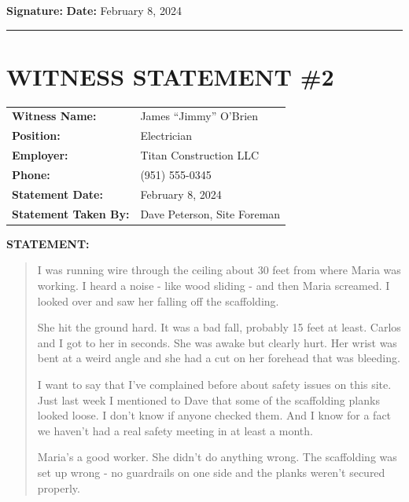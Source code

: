 \documentclass[11pt]{article}
\begin{document}
\vspace{1em}

\noindent\textbf{Signature:} \underline{\hspace{5cm}} \hfill \textbf{Date:} February 8, 2024

\vspace{3em}
\hrule
\vspace{2em}

\section*{WITNESS STATEMENT \#2}

\begin{tabular}{@{}p{4cm}p{10cm}@{}}
\textbf{Witness Name:} & James ``Jimmy'' O'Brien \\
\textbf{Position:} & Electrician \\
\textbf{Employer:} & Titan Construction LLC \\
\textbf{Phone:} & (951) 555-0345 \\
\textbf{Statement Date:} & February 8, 2024 \\
\textbf{Statement Taken By:} & Dave Peterson, Site Foreman \\
\end{tabular}

\vspace{1em}

\noindent\textbf{STATEMENT:}

\begin{quote}
I was running wire through the ceiling about 30 feet from where Maria was working. I heard a noise - like wood sliding - and then Maria screamed. I looked over and saw her falling off the scaffolding.

She hit the ground hard. It was a bad fall, probably 15 feet at least. Carlos and I got to her in seconds. She was awake but clearly hurt. Her wrist was bent at a weird angle and she had a cut on her forehead that was bleeding.

I want to say that I've complained before about safety issues on this site. Just last week I mentioned to Dave that some of the scaffolding planks looked loose. I don't know if anyone checked them. And I know for a fact we haven't had a real safety meeting in at least a month.

Maria's a good worker. She didn't do anything wrong. The scaffolding was set up wrong - no guardrails on one side and the planks weren't secured properly.
\end{quote}
\end{document}
